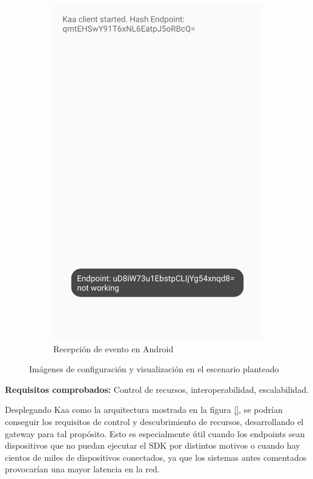 \documentclass[12pt, twoside]{book}
\begin{document}
\begin{itemize}
\begin{figure}[H]
\begin{subfigure}{.5\textwidth}
  \includegraphics[scale = 0.09]{images/capture_android_ping}
  \caption{Recepción de evento en Android}
  \label{fig:sfig2}
\end{subfigure}
\caption{Imágenes de configuración y visualización en el escenario planteado}
\label{fig:fig}
\end{figure}
\textbf{Requisitos comprobados: } Control de recursos, interoperabilidad, escalabilidad.
\end{itemize} 

Desplegando Kaa como la arquitectura mostrada en la figura \ref{}, se podrían conseguir los requisitos de control y descubrimiento de recursos, desarrollando el gateway para tal propósito. Esto es especialmente útil cuando los endpoints sean dispositivos que no puedan ejecutar el SDK por distintos motivos o cuando hay cientos de miles de dispositivos conectados, ya que los sistemas antes comentados provocarían una mayor latencia en la red.
\end{document}
